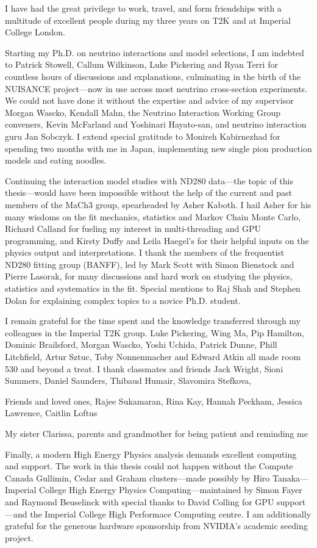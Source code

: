 \begin{acknowledgements}
	I have had the great privilege to work, travel, and form friendships with a multitude of excellent people during my three years on T2K and at Imperial College London.
	
	Starting my Ph.D. on neutrino interactions and model selections, I am indebted to Patrick Stowell, Callum Wilkinson, Luke Pickering and Ryan Terri for countless hours of discussions and explanations, culminating in the birth of the NUISANCE\cite{nuisance} project---now in use across most neutrino cross-section experiments. We could not have done it without the expertise and advice of my supervisor Morgan Wascko, Kendall Mahn, the Neutrino Interaction Working Group conveners, Kevin McFarland and Yoshinari Hayato-san, and neutrino interaction guru Jan Sobczyk. I extend special gratitude to Monireh Kabirnezhad for spending two months with me in Japan, implementing new single pion production models and eating noodles.
  
	Continuing the interaction model studies with ND280 data---the topic of this thesis---would have been impossible without the help of the current and past members of the MaCh3 group, spearheaded by Asher Kaboth. I hail Asher for his many wisdoms on the fit mechanics, statistics and Markov Chain Monte Carlo, Richard Calland for fueling my interest in multi-threading and GPU programming, and Kirsty Duffy and Leila Haegel's for their helpful inputs on the physics output and interpretations. I thank the members of the frequentist ND280 fitting group (BANFF), led by Mark Scott with Simon Bienstock and Pierre Lasorak, for many discussions and hard work on studying the physics, statistics and systematics in the fit. Special mentions to Raj Shah and Stephen Dolan for explaining complex topics to a novice Ph.D. student.
	
	I remain grateful for the time spent and the knowledge transferred through my colleagues in the Imperial T2K group. Luke Pickering, Wing Ma, Pip Hamilton, Dominic Brailsford, Morgan Wascko, Yoshi Uchida, Patrick Dunne, Phill Litchfield, Artur Sztuc, Toby Nonnenmacher and Edward Atkin all made room 530 and beyond a treat. I thank classmates and friends Jack Wright, Sioni Summers, Daniel Saunders, Thibaud Humair, Slavomira Stefkova,
	
	Friends and loved ones, Rajee Sukamaran, Rina Kay, Hannah Peckham, Jessica Lawrence, Caitlin Loftus
  
  My sister Clarissa, parents and grandmother for being patient and reminding me 
  
  Finally, a modern High Energy Physics analysis demands excellent computing and support. The work in this thesis could not happen without the Compute Canada Gullimin, Cedar and Graham clusters---made possibly by Hiro Tanaka---Imperial College High Energy Physics Computing---maintained by Simon Fayer and Raymond Beuselinck with special thanks to David Colling for GPU support---and the Imperial College High Performace Computing centre. I am additionally grateful for the generous hardware sponsorship from NVIDIA's academic seeding project.
\end{acknowledgements}

